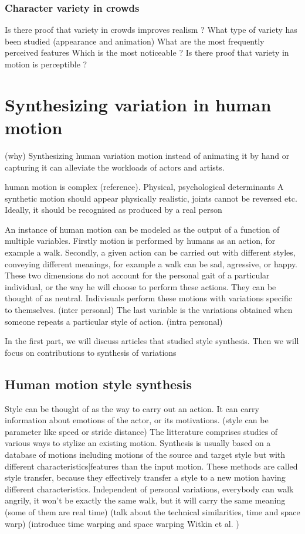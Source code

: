 \documentclass[11pt]{sdm}
\begin{document}
\subsubsection{Character variety in crowds}
Is there proof that variety in crowds improves realism ?
What type of variety has been studied (appearance and animation)
What are the most frequently perceived features
Which is the most noticeable ?
Is there proof that variety in motion is perceptible ?

\section{Synthesizing variation in human motion}

(why)
Synthesizing human variation motion instead of animating it by hand or capturing it can alleviate the workloads of actors and artists.

human motion is complex (reference). Physical, psychological determinants
A synthetic motion should appear physically realistic, joints cannot be reversed etc.
Ideally, it should be recognised as produced by a real person

An instance of human motion can be modeled as the output of a function of multiple variables.
Firstly motion is performed by humans as an action, for example a walk.
Secondly, a given action can be carried out with different styles, conveying different meanings, for example a walk can be sad, agressive, or happy.
These two dimensions do not account for the personal gait of a particular individual, or the way he will choose to perform these actions. They can be thought of as neutral. 
Indivisuals perform these motions with variations specific to themselves. (inter personal)
The last variable is the variations obtained when someone repeats a particular style of action. (intra personal)

In the first part, we will discuss articles that studied style synthesis. Then we will focus on contributions to synthesis of variations

\subsection{Human motion style synthesis}

Style can be thought of as the way to carry out an action. It can carry information about emotions of the actor, or its motivations.
(style can be parameter like speed or stride distance)
The litterature comprises studies of various ways to stylize an existing motion. Synthesis is usually based on a database of motions including motions of the source and target style but with different characteristics|features than the input motion.
These methods are called style transfer, because they effectively transfer a style to a new motion having different characteristics. 
Independent of personal variations, everybody can walk angrily, it won't be exactly the same walk, but it will carry the same meaning
(some of them are real time)
(talk about the technical similarities, time and space warp)
(introduce time warping and space warping Witkin et al. \cite{Witkin:1995:MW:218380.218422})
\end{document}
